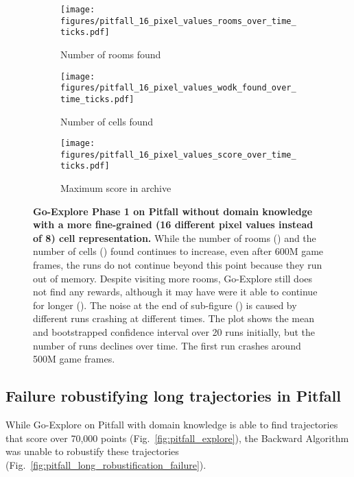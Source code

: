 \documentclass{article}
\begin{document}
\begin{figure}[tbh]
    \begin{subfigure}[t]{.33\textwidth}
        \centering
        \texttt{[image: figures/pitfall\_16\_pixel\_values\_rooms\_over\_time\_ticks.pdf]}
        \caption{Number of rooms found}
        \label{fig:pitfall_fine_grained_room}
    \end{subfigure}
    \begin{subfigure}[t]{.33\textwidth}
        \centering
        \texttt{[image: figures/pitfall\_16\_pixel\_values\_wodk\_found\_over\_time\_ticks.pdf]}
        \caption{Number of cells found}
        \label{fig:pitfall_fine_grained_cell}
    \end{subfigure}
    \begin{subfigure}[t]{.33\textwidth}
        \centering
        \texttt{[image: figures/pitfall\_16\_pixel\_values\_score\_over\_time\_ticks.pdf]}
        \caption{Maximum score in archive}
        \label{fig:pitfall_fine_grained_score}
    \end{subfigure}
    \caption{\textbf{Go-Explore Phase 1 on Pitfall without domain knowledge with a more fine-grained (16 different pixel values instead of 8) cell representation.} While the number of rooms () and the number of cells () found continues to increase, even after 600M game frames, the runs do not continue beyond this point because they run out of memory. Despite visiting more rooms, Go-Explore still does not find any rewards, although it may have were it able to continue for longer (). The noise at the end of sub-figure () is caused by different runs crashing at different times. The plot shows the mean and  bootstrapped confidence interval over 20 runs initially, but the number of runs declines over time. The first run crashes around 500M game frames.}
    \label{fig:pitfall_explore_fine_grained}
\end{figure}

\FloatBarrier

\subsection{Failure robustifying long trajectories in Pitfall}
\label{sec:pitfall_long_robustification_failure}

While Go-Explore on Pitfall with domain knowledge is able to find trajectories that score over 70,000 points (Fig.~\ref{fig:pitfall_explore}), the Backward Algorithm was unable to robustify these trajectories (Fig.~\ref{fig:pitfall_long_robustification_failure}).
\end{document}
